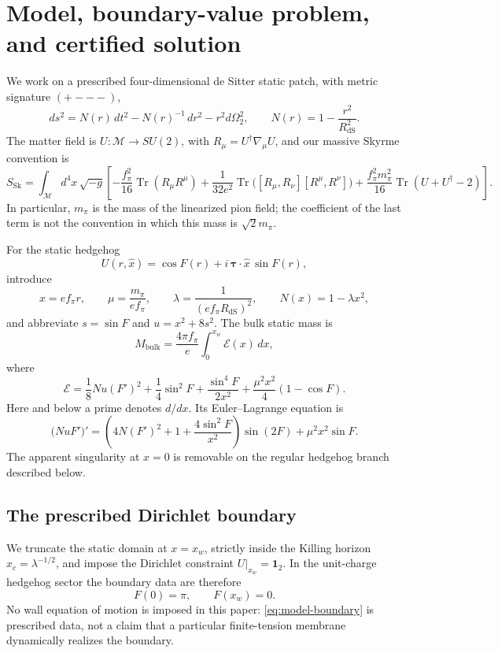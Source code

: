 \section{Model, boundary-value problem, and certified solution}
\label{sec:model}

We work on a prescribed four-dimensional de Sitter static patch, with metric
signature \((+---)\),
\[
  ds^2=N(r)\,dt^2-N(r)^{-1}\,dr^2-r^2d\Omega_2^2,
  \qquad
  N(r)=1-\frac{r^2}{R_{\mathrm{dS}}^2}.
\]
The matter field is \(U\colon\mathcal M\to SU(2)\), with
\(R_\mu=U^\dagger\nabla_\mu U\), and our massive Skyrme convention is
\[
  S_{\mathrm{Sk}}
  =\int_{\mathcal M}d^4x\,\sqrt{-g}\left[
    -\frac{f_\pi^2}{16}\operatorname{Tr}(R_\mu R^\mu)
    +\frac{1}{32e^2}\operatorname{Tr}
       \bigl([R_\mu,R_\nu][R^\mu,R^\nu]\bigr)
    +\frac{f_\pi^2m_\pi^2}{16}
       \operatorname{Tr}(U+U^\dagger-2)
  \right].
\]
In particular, \(m_\pi\) is the mass of the linearized pion field; the
coefficient of the last term is not the convention in which this mass is
\(\sqrt{2}m_\pi\).

For the static hedgehog
\[
  U(r,\widehat x)=\cos F(r)
  +i\,\boldsymbol\tau\mathbin{\cdot}\widehat x\,\sin F(r),
\]
introduce
\[
  x=ef_\pi r,
  \qquad
  \mu=\frac{m_\pi}{ef_\pi},
  \qquad
  \lambda=\frac{1}{(ef_\pi R_{\mathrm{dS}})^2},
  \qquad
  N(x)=1-\lambda x^2,
\]
and abbreviate \(s=\sin F\) and \(u=x^2+8s^2\).  The bulk static mass is
\[
  M_{\mathrm{bulk}}=\frac{4\pi f_\pi}{e}
     \int_0^{x_w}\mathcal E(x)\,dx,
\]
where
\[
  \mathcal E
  =\frac18Nu(F')^2+\frac14\sin^2F
    +\frac{\sin^4F}{2x^2}
    +\frac{\mu^2x^2}{4}(1-\cos F).
\]
Here and below a prime denotes \(d/dx\).  Its Euler--Lagrange equation is
\begin{equation}
  \bigl(NuF'\bigr)'
  =\left(4N(F')^2+1+\frac{4\sin^2F}{x^2}\right)\sin(2F)
    +\mu^2x^2\sin F.
  \label{eq:model-profile}
\end{equation}
The apparent singularity at \(x=0\) is removable on the regular hedgehog
branch described below.

\subsection*{The prescribed Dirichlet boundary}

We truncate the static domain at \(x=x_w\), strictly inside the Killing horizon
\(x_c=\lambda^{-1/2}\), and impose the Dirichlet constraint
\(U|_{x_w}=\mathbf 1_2\).  In the unit-charge hedgehog sector the
boundary data are therefore
\begin{equation}
  F(0)=\pi,
  \qquad
  F(x_w)=0.
  \label{eq:model-boundary}
\end{equation}
No wall equation of motion is imposed in this paper:
\eqref{eq:model-boundary} is prescribed data,
not a claim that a particular finite-tension membrane dynamically realizes the
boundary.

